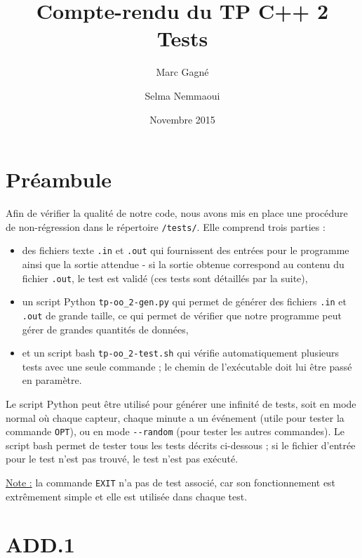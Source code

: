 \documentclass[11pt,a4paper]{article}
\begin{document}
\title{
	Compte-rendu du TP C++ 2\\
	Tests
}
\author{
	Marc Gagné\\
	\and
	Selma Nemmaoui
}
\date{Novembre 2015}
\maketitle

\section*{Préambule}

Afin de vérifier la qualité de notre code, nous avons mis en place une procédure de non-régression dans le répertoire \texttt{/tests/}. Elle comprend trois parties :
\begin{itemize}
  \item des fichiers texte \texttt{.in} et \texttt{.out} qui fournissent des entrées pour le programme ainsi que la sortie attendue - si la sortie obtenue correspond au contenu du fichier \texttt{.out}, le test est validé (ces tests sont détaillés par la suite),
  \item un script Python \texttt{tp-oo\_2-gen.py} qui permet de générer des fichiers \texttt{.in} et \texttt{.out} de grande taille, ce qui permet de vérifier que notre programme peut gérer de grandes quantités de données,
  \item et un script bash \texttt{tp-oo\_2-test.sh} qui vérifie automatiquement plusieurs tests avec une seule commande ; le chemin de l'exécutable doit lui être passé en paramètre.
\end{itemize}

Le script Python peut être utilisé pour générer une infinité de tests, soit en mode normal où chaque capteur, chaque minute a un événement (utile pour tester la commande \texttt{OPT}), ou en mode \texttt{-{}-random} (pour tester les autres commandes). Le script bash permet de tester tous les tests décrits ci-dessous ; si le fichier d'entrée pour le test  n'est pas trouvé, le test n'est pas exécuté.

\underline{Note :} la commande \texttt{EXIT} n'a pas de test associé, car son fonctionnement est extrêmement simple et elle est utilisée dans chaque test.

\section*{ADD.1}
\label{sec:ADD.1}
\end{document}
